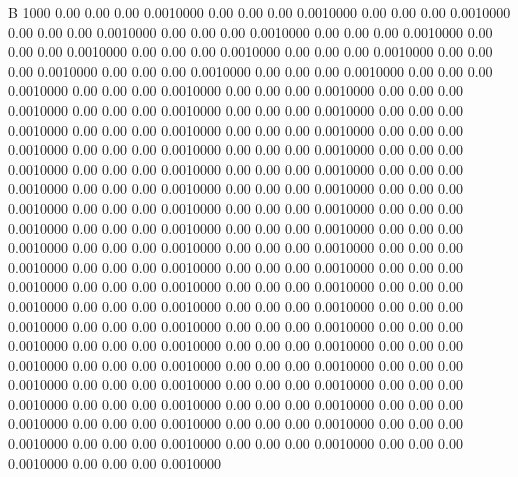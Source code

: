 


B 1000
   0.00    0.00    0.00   0.0010000
   0.00    0.00    0.00   0.0010000
   0.00    0.00    0.00   0.0010000
   0.00    0.00    0.00   0.0010000
   0.00    0.00    0.00   0.0010000
   0.00    0.00    0.00   0.0010000
   0.00    0.00    0.00   0.0010000
   0.00    0.00    0.00   0.0010000
   0.00    0.00    0.00   0.0010000
   0.00    0.00    0.00   0.0010000
   0.00    0.00    0.00   0.0010000
   0.00    0.00    0.00   0.0010000
   0.00    0.00    0.00   0.0010000
   0.00    0.00    0.00   0.0010000
   0.00    0.00    0.00   0.0010000
   0.00    0.00    0.00   0.0010000
   0.00    0.00    0.00   0.0010000
   0.00    0.00    0.00   0.0010000
   0.00    0.00    0.00   0.0010000
   0.00    0.00    0.00   0.0010000
   0.00    0.00    0.00   0.0010000
   0.00    0.00    0.00   0.0010000
   0.00    0.00    0.00   0.0010000
   0.00    0.00    0.00   0.0010000
   0.00    0.00    0.00   0.0010000
   0.00    0.00    0.00   0.0010000
   0.00    0.00    0.00   0.0010000
   0.00    0.00    0.00   0.0010000
   0.00    0.00    0.00   0.0010000
   0.00    0.00    0.00   0.0010000
   0.00    0.00    0.00   0.0010000
   0.00    0.00    0.00   0.0010000
   0.00    0.00    0.00   0.0010000
   0.00    0.00    0.00   0.0010000
   0.00    0.00    0.00   0.0010000
   0.00    0.00    0.00   0.0010000
   0.00    0.00    0.00   0.0010000
   0.00    0.00    0.00   0.0010000
   0.00    0.00    0.00   0.0010000
   0.00    0.00    0.00   0.0010000
   0.00    0.00    0.00   0.0010000
   0.00    0.00    0.00   0.0010000
   0.00    0.00    0.00   0.0010000
   0.00    0.00    0.00   0.0010000
   0.00    0.00    0.00   0.0010000
   0.00    0.00    0.00   0.0010000
   0.00    0.00    0.00   0.0010000
   0.00    0.00    0.00   0.0010000
   0.00    0.00    0.00   0.0010000
   0.00    0.00    0.00   0.0010000
   0.00    0.00    0.00   0.0010000
   0.00    0.00    0.00   0.0010000
   0.00    0.00    0.00   0.0010000
   0.00    0.00    0.00   0.0010000
   0.00    0.00    0.00   0.0010000
   0.00    0.00    0.00   0.0010000
   0.00    0.00    0.00   0.0010000
   0.00    0.00    0.00   0.0010000
   0.00    0.00    0.00   0.0010000
   0.00    0.00    0.00   0.0010000
   0.00    0.00    0.00   0.0010000
   0.00    0.00    0.00   0.0010000
   0.00    0.00    0.00   0.0010000
   0.00    0.00    0.00   0.0010000
   0.00    0.00    0.00   0.0010000
   0.00    0.00    0.00   0.0010000
   0.00    0.00    0.00   0.0010000
   0.00    0.00    0.00   0.0010000
   0.00    0.00    0.00   0.0010000
   0.00    0.00    0.00   0.0010000
   0.00    0.00    0.00   0.0010000
